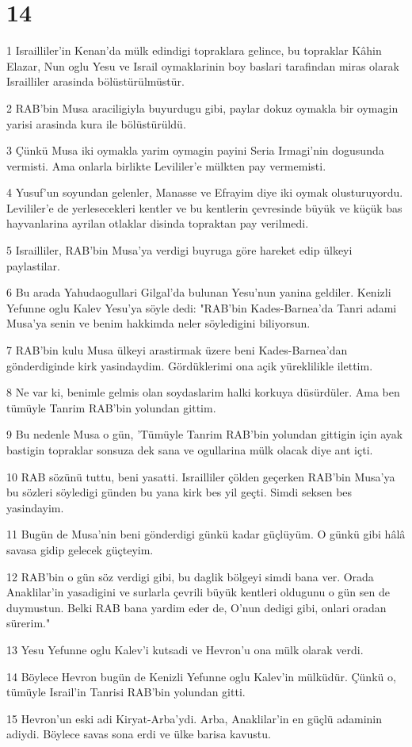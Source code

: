 \chapter{14}

\par 1 Israilliler'in Kenan'da mülk edindigi topraklara gelince, bu topraklar Kâhin Elazar, Nun oglu Yesu ve Israil oymaklarinin boy baslari tarafindan miras olarak Israilliler arasinda bölüstürülmüstür.
\par 2 RAB'bin Musa araciligiyla buyurdugu gibi, paylar dokuz oymakla bir oymagin yarisi arasinda kura ile bölüstürüldü.
\par 3 Çünkü Musa iki oymakla yarim oymagin payini Seria Irmagi'nin dogusunda vermisti. Ama onlarla birlikte Levililer'e mülkten pay vermemisti.
\par 4 Yusuf'un soyundan gelenler, Manasse ve Efrayim diye iki oymak olusturuyordu. Levililer'e de yerlesecekleri kentler ve bu kentlerin çevresinde büyük ve küçük bas hayvanlarina ayrilan otlaklar disinda topraktan pay verilmedi.
\par 5 Israilliler, RAB'bin Musa'ya verdigi buyruga göre hareket edip ülkeyi paylastilar.
\par 6 Bu arada Yahudaogullari Gilgal'da bulunan Yesu'nun yanina geldiler. Kenizli Yefunne oglu Kalev Yesu'ya söyle dedi: "RAB'bin Kades-Barnea'da Tanri adami Musa'ya senin ve benim hakkimda neler söyledigini biliyorsun.
\par 7 RAB'bin kulu Musa ülkeyi arastirmak üzere beni Kades-Barnea'dan gönderdiginde kirk yasindaydim. Gördüklerimi ona açik yüreklilikle ilettim.
\par 8 Ne var ki, benimle gelmis olan soydaslarim halki korkuya düsürdüler. Ama ben tümüyle Tanrim RAB'bin yolundan gittim.
\par 9 Bu nedenle Musa o gün, 'Tümüyle Tanrim RAB'bin yolundan gittigin için ayak bastigin topraklar sonsuza dek sana ve ogullarina mülk olacak diye ant içti.
\par 10 RAB sözünü tuttu, beni yasatti. Israilliler çölden geçerken RAB'bin Musa'ya bu sözleri söyledigi günden bu yana kirk bes yil geçti. Simdi seksen bes yasindayim.
\par 11 Bugün de Musa'nin beni gönderdigi günkü kadar güçlüyüm. O günkü gibi hâlâ savasa gidip gelecek güçteyim.
\par 12 RAB'bin o gün söz verdigi gibi, bu daglik bölgeyi simdi bana ver. Orada Anaklilar'in yasadigini ve surlarla çevrili büyük kentleri oldugunu o gün sen de duymustun. Belki RAB bana yardim eder de, O'nun dedigi gibi, onlari oradan sürerim."
\par 13 Yesu Yefunne oglu Kalev'i kutsadi ve Hevron'u ona mülk olarak verdi.
\par 14 Böylece Hevron bugün de Kenizli Yefunne oglu Kalev'in mülküdür. Çünkü o, tümüyle Israil'in Tanrisi RAB'bin yolundan gitti.
\par 15 Hevron'un eski adi Kiryat-Arba'ydi. Arba, Anaklilar'in en güçlü adaminin adiydi. Böylece savas sona erdi ve ülke barisa kavustu.

